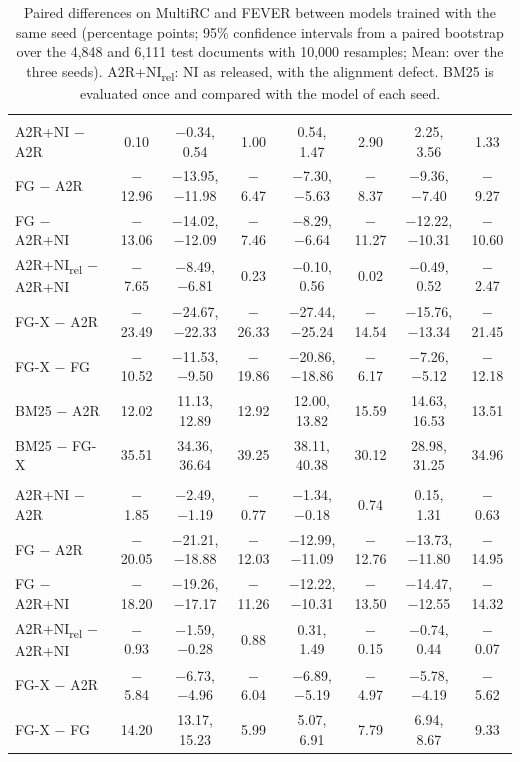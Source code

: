 \documentclass[11pt]{article}
\begin{document}
\begin{table}[t]
\begin{tabular}{@{}lccccccc@{}}
\addlinespace
\multicolumn{8}{@{}l}{\emph{FEVER, sentence F1}} \\
A2R+NI $-$ A2R & 0.10 & $-$0.34, 0.54 & 1.00 & 0.54, 1.47 & 2.90 & 2.25, 3.56 & 1.33 \\
FG $-$ A2R & $-$12.96 & $-$13.95, $-$11.98 & $-$6.47 & $-$7.30, $-$5.63 & $-$8.37 & $-$9.36, $-$7.40 & $-$9.27 \\
FG $-$ A2R+NI & $-$13.06 & $-$14.02, $-$12.09 & $-$7.46 & $-$8.29, $-$6.64 & $-$11.27 & $-$12.22, $-$10.31 & $-$10.60 \\
A2R+NI\textsubscript{rel} $-$ A2R+NI & $-$7.65 & $-$8.49, $-$6.81 & 0.23 & $-$0.10, 0.56 & 0.02 & $-$0.49, 0.52 & $-$2.47 \\
FG-X $-$ A2R & $-$23.49 & $-$24.67, $-$22.33 & $-$26.33 & $-$27.44, $-$25.24 & $-$14.54 & $-$15.76, $-$13.34 & $-$21.45 \\
FG-X $-$ FG & $-$10.52 & $-$11.53, $-$9.50 & $-$19.86 & $-$20.86, $-$18.86 & $-$6.17 & $-$7.26, $-$5.12 & $-$12.18 \\
BM25 $-$ A2R & 12.02 & 11.13, 12.89 & 12.92 & 12.00, 13.82 & 15.59 & 14.63, 16.53 & 13.51 \\
BM25 $-$ FG-X & 35.51 & 34.36, 36.64 & 39.25 & 38.11, 40.38 & 30.12 & 28.98, 31.25 & 34.96 \\
\addlinespace
\multicolumn{8}{@{}l}{\emph{FEVER, accuracy}} \\
A2R+NI $-$ A2R & $-$1.85 & $-$2.49, $-$1.19 & $-$0.77 & $-$1.34, $-$0.18 & 0.74 & 0.15, 1.31 & $-$0.63 \\
FG $-$ A2R & $-$20.05 & $-$21.21, $-$18.88 & $-$12.03 & $-$12.99, $-$11.09 & $-$12.76 & $-$13.73, $-$11.80 & $-$14.95 \\
FG $-$ A2R+NI & $-$18.20 & $-$19.26, $-$17.17 & $-$11.26 & $-$12.22, $-$10.31 & $-$13.50 & $-$14.47, $-$12.55 & $-$14.32 \\
A2R+NI\textsubscript{rel} $-$ A2R+NI & $-$0.93 & $-$1.59, $-$0.28 & 0.88 & 0.31, 1.49 & $-$0.15 & $-$0.74, 0.44 & $-$0.07 \\
FG-X $-$ A2R & $-$5.84 & $-$6.73, $-$4.96 & $-$6.04 & $-$6.89, $-$5.19 & $-$4.97 & $-$5.78, $-$4.19 & $-$5.62 \\
FG-X $-$ FG & 14.20 & 13.17, 15.23 & 5.99 & 5.07, 6.91 & 7.79 & 6.94, 8.67 & 9.33 \\
\bottomrule
\end{tabular}
\caption{Paired differences on MultiRC and FEVER between models trained with the same seed (percentage points; 95\% confidence intervals from a paired bootstrap over the 4,848 and 6,111 test documents with 10,000 resamples; Mean: over the three seeds). A2R+NI\textsubscript{rel}: NI as released, with the alignment defect. BM25 is evaluated once and compared with the model of each seed.}
\label{tab:sentence-paired}
\end{table}
\end{document}

